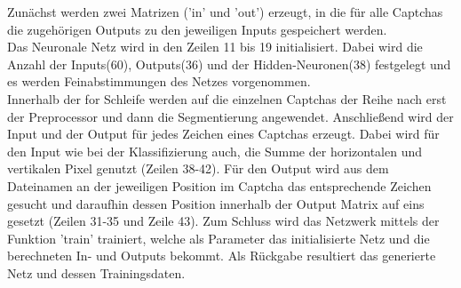 Zunächst werden zwei Matrizen ('in' und 'out') erzeugt, in die für alle Captchas die zugehörigen Outputs zu den jeweiligen Inputs gespeichert werden.\\
Das Neuronale Netz wird in den Zeilen 11 bis 19 initialisiert. Dabei wird die Anzahl der Inputs(60), Outputs(36) und der Hidden-Neuronen(38) festgelegt und es werden Feinabstimmungen des Netzes vorgenommen.\\
Innerhalb der for Schleife werden auf die einzelnen Captchas der Reihe nach erst der Preprocessor und dann die Segmentierung angewendet. Anschließend wird der Input und der Output für jedes Zeichen eines Captchas erzeugt. Dabei wird für den Input wie bei der Klassifizierung auch, die Summe der horizontalen und vertikalen Pixel genutzt (Zeilen 38-42). Für den Output wird aus dem Dateinamen an der jeweiligen Position im Captcha das entsprechende Zeichen gesucht und daraufhin dessen Position innerhalb der Output Matrix auf eins gesetzt (Zeilen 31-35 und Zeile 43). Zum Schluss wird das Netzwerk mittels der Funktion 'train' trainiert, welche als Parameter das initialisierte Netz und die berechneten In- und Outputs bekommt. Als Rückgabe resultiert das generierte Netz und dessen Trainingsdaten.

\newpage
